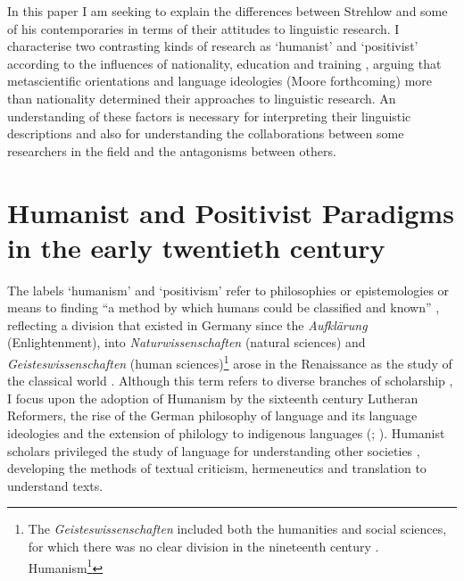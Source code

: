 \documentclass[output=paper]{langsci/langscibook}
\begin{document}
 In this paper I am seeking to explain the differences between Strehlow and some of his contemporaries in terms of their attitudes to linguistic research. I characterise two contrasting kinds of research as ‘humanist’ and ‘positivist’ according to the influences of nationality, education and training \citep[94]{errington_linguistics_2008}, arguing that metascientific orientations and language ideologies (Moore forthcoming) more than nationality determined their approaches to linguistic research. An understanding of these factors is necessary for interpreting their linguistic descriptions and also for understanding the collaborations between some researchers in the field and the antagonisms between others.  
 
 \section{Humanist and Positivist Paradigms in the early twentieth century}

The labels ‘humanism’ and ‘positivism’ refer to philosophies or epistemologies or means to finding “a method by which humans could be classified and known” \citep[186]{zimmerman_anthropology_2001}, reflecting a division that existed in Germany since the \textit{Aufklärung} (Enlightenment), into \textit{Naturwissenschaften} (natural sciences) and \textit{Geisteswissenschaften} (human sciences)\footnote{ \textrm{The} \textrm{\textit{Geisteswissenschaften}} \textrm{included both the humanities and social sciences, for which there was no clear division in the nineteenth century \citep[282]{adams_philosophical_1998}}. Humanism\footnote{ \textrm{Another term which contrasts with ‘Positivist’ is ‘Idealist’ \citep{vossler_positivimus_1904}} which applies to developments in German philosophy later than the Humanist origins in the sixteenth century.}} arose in the Renaissance as the study of the classical world \citep[172]{giustiniani_homo_1985}. Although this term refers to diverse branches of scholarship \citep[258]{adams_philosophical_1998}, I focus upon the adoption of Humanism by the sixteenth century Lutheran Reformers, the rise of the German philosophy of language and its language ideologies and the extension of philology to indigenous languages (\citealt[328]{harding_indigenous_2018}; \citealt{moore_language_forthcoming}). Humanist scholars privileged the study of language for understanding other societies \citep[53]{zimmerman_anthropology_2001}, developing the methods of textual criticism, hermeneutics and translation to understand texts. 
\end{document}
